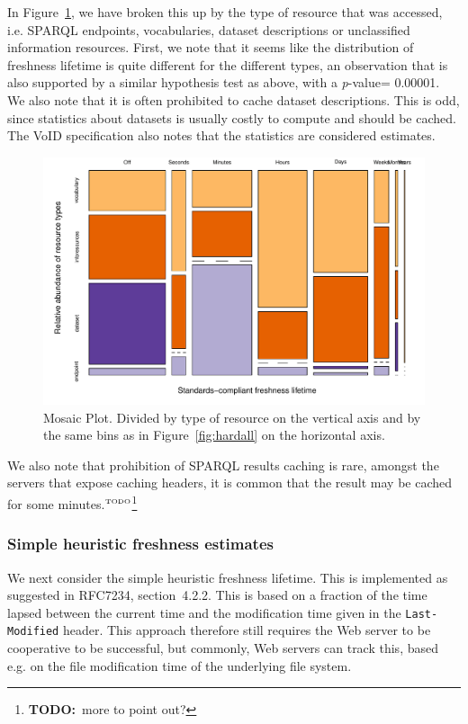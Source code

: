 \documentclass{llncs}
\newcommand{\pvalue}{\textit{p}-value}
\newcommand{\httph}[1]{\texttt{#1}}
\newcommand{\todo}[1]{\ensuremath{^{\textrm{\tiny{TODO}\normalsize}}}\footnote{\textbf{TODO:}~#1}}
\begin{document}
In Figure~\ref{fig:hardtable}, we have broken this
up by the type of resource that was accessed, i.e. SPARQL endpoints,
vocabularies, dataset descriptions or unclassified information
resources. First, we note that it seems like the distribution of
freshness lifetime is quite different for the different types, an
observation that is also supported by a similar hypothesis test as
above, with a \pvalue = 0.00001. We also note that it is often
prohibited to cache dataset descriptions. This is odd, since
statistics about datasets is usually costly to compute and should be
cached. The VoID specification \cite{voidnote} also notes that the
statistics are considered estimates.

\begin{figure}[ht!]
  \centerline{%
    \includegraphics[width=.9\textwidth]{hardtable.pdf}}
  \caption{Mosaic Plot. Divided by type of resource on the vertical
    axis and by the same bins as in Figure~\ref{fig:hardall} on the
    horizontal axis. }
  \label{fig:hardtable}
\end{figure}


We also note that prohibition of SPARQL results caching is rare,
amongst the servers that expose caching headers, it is common
that the result may be cached for some minutes.\todo{more to point
  out?}

\subsubsection{Simple heuristic freshness estimates}\label{sec:simplefresh}

We next consider the simple heuristic freshness lifetime. This is
implemented as suggested in RFC7234, section~4.2.2. This is based on a
fraction of the time lapsed between the current time and the
modification time given in the \httph{Last-Modified} header. This
approach therefore still requires the Web server to be cooperative to
be successful, but commonly, Web servers can track this, based e.g. on
the file modification time of the underlying file system.
\end{document}
